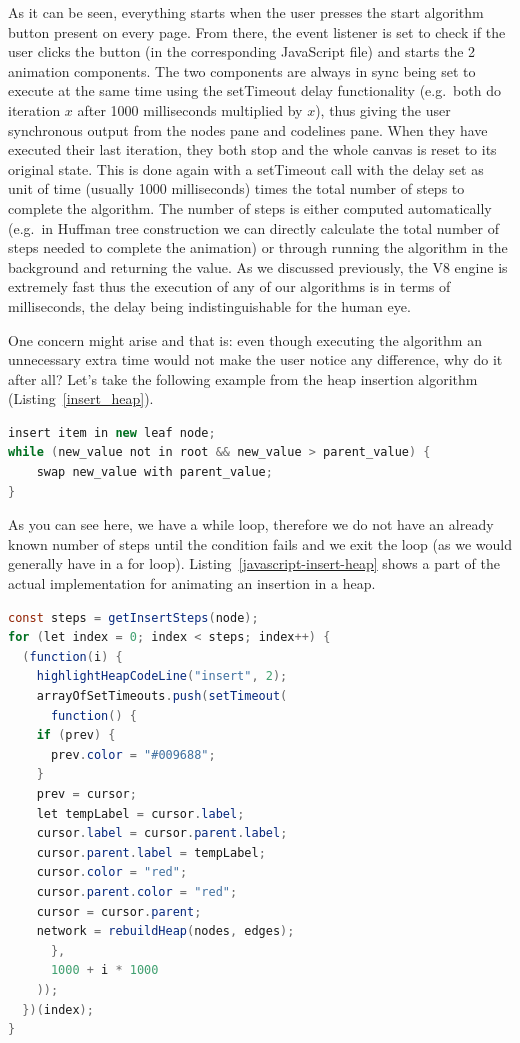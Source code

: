 \documentclass{l4proj}
\begin{document}
As it can be seen, everything starts when the user presses the start algorithm button present on every page. From
there, the event listener is set to check if the user clicks the button (in the corresponding JavaScript
file) and starts the 2 animation components. The two components are always in sync being set to execute at the same time using the setTimeout delay functionality (e.g.\ both do iteration $x$ after 1000 milliseconds multiplied by $x$), thus giving the user
synchronous output from the nodes pane and codelines pane. When they have executed their last iteration, they
both stop and the whole canvas is reset to its original state. This is done again with a setTimeout call with the delay
set as unit of time (usually 1000 milliseconds) times the total number of steps to complete the algorithm. The number
of steps is either computed automatically (e.g.\ in Huffman tree construction we can directly calculate the total number
of steps needed to complete the animation) or through running the algorithm in the background and returning the value.
As we discussed previously, the V8 engine is extremely fast thus the execution of any of our algorithms is in terms of
milliseconds, the delay being indistinguishable for the human eye. 

One concern might arise and that is: even though executing the algorithm an unnecessary extra time would not make the
user notice any difference, why do it after all? Let's take the following example from the heap insertion algorithm
(Listing~\ref{insert_heap}).

\begin{lstlisting}[language={Java}, label={insert_heap},caption={Pseudocode for inserting a node in a heap.}]
insert item in new leaf node; 
while (new_value not in root && new_value > parent_value) {
    swap new_value with parent_value;
}
\end{lstlisting}

As you can see here, we have a while loop, therefore we do not have an already known number of steps until the
condition fails and we exit the loop (as we would generally have in a for loop). Listing~\ref{javascript-insert-heap}
shows a part of the actual implementation for
animating an insertion in a heap.

\begin{lstlisting}[language={Java}, label={javascript-insert-heap}, caption={Actual implementation for animating the
insertion of a heap node.}]
const steps = getInsertSteps(node);
for (let index = 0; index < steps; index++) {
  (function(i) {
    highlightHeapCodeLine("insert", 2);
    arrayOfSetTimeouts.push(setTimeout(
      function() {
	if (prev) {
	  prev.color = "#009688";
	}
	prev = cursor;
	let tempLabel = cursor.label;
	cursor.label = cursor.parent.label;
	cursor.parent.label = tempLabel;
	cursor.color = "red";
	cursor.parent.color = "red";
	cursor = cursor.parent;
	network = rebuildHeap(nodes, edges);
      },
      1000 + i * 1000
    ));
  })(index);
}
\end{lstlisting}
\end{document}
